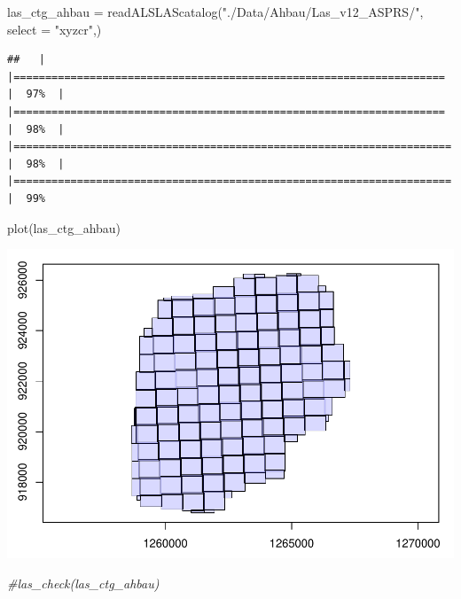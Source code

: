\documentclass[
]{article}
\newenvironment{Shaded}{\begin{snugshade}}{\end{snugshade}}
\newcommand{\AttributeTok}[1]{\textcolor[rgb]{0.77,0.63,0.00}{#1}}
\newcommand{\CommentTok}[1]{\textcolor[rgb]{0.56,0.35,0.01}{\textit{#1}}}
\newcommand{\FunctionTok}[1]{\textcolor[rgb]{0.00,0.00,0.00}{#1}}
\newcommand{\NormalTok}[1]{#1}
\newcommand{\OtherTok}[1]{\textcolor[rgb]{0.56,0.35,0.01}{#1}}
\newcommand{\StringTok}[1]{\textcolor[rgb]{0.31,0.60,0.02}{#1}}
\begin{document}
\begin{Shaded}
\begin{Highlighting}[]
\NormalTok{las\_ctg\_ahbau }\OtherTok{=} \FunctionTok{readALSLAScatalog}\NormalTok{(}\StringTok{"./Data/Ahbau/Las\_v12\_ASPRS/"}\NormalTok{, }\AttributeTok{select =} \StringTok{"xyzcr"}\NormalTok{,)}
\end{Highlighting}
\end{Shaded}

\begin{verbatim}
##   |                                                                              |====================================================================  |  97%  |                                                                              |====================================================================  |  98%  |                                                                              |===================================================================== |  98%  |                                                                              |===================================================================== |  99%
\end{verbatim}

\begin{Shaded}
\begin{Highlighting}[]
\FunctionTok{plot}\NormalTok{(las\_ctg\_ahbau)}
\end{Highlighting}
\end{Shaded}

\includegraphics{13_lidR_PointCloud_Processing_files/figure-latex/unnamed-chunk-2-1.pdf}

\begin{Shaded}
\begin{Highlighting}[]
\CommentTok{\#las\_check(las\_ctg\_ahbau)}
\end{Highlighting}
\end{Shaded}
\end{document}

